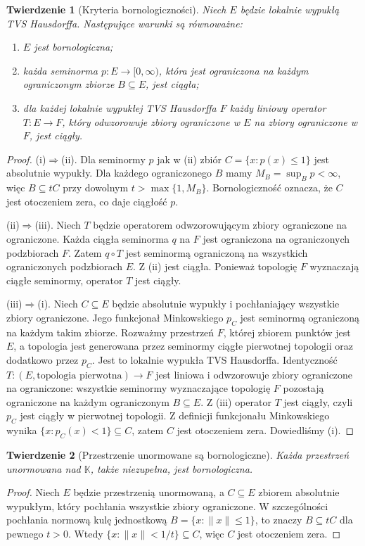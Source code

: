 \documentclass[11pt,a4paper]{article}
\numberwithin{equation}{section}
\theoremstyle{plain}
\newtheorem{twierdzenie}{Twierdzenie}[section]
\theoremstyle{definition}
\theoremstyle{remark}
\newcommand{\K}{\mathbb K}
\begin{document}
\begin{twierdzenie}[Kryteria bornologiczności]\label{thm:bornological-equiv}
Niech $E$ będzie lokalnie wypukłą TVS Hausdorffa.
Następujące warunki są równoważne:
\begin{enumerate}[label=\textup{(\roman*)}]
\item $E$ jest bornologiczna;
\item każda seminorma $p:E\to[0,\infty)$, która jest
ograniczona na każdym ograniczonym zbiorze $B\subseteq E$,
jest ciągła;
\item dla każdej lokalnie wypukłej TVS Hausdorffa $F$
każdy liniowy operator $T:E\to F$, który odwzorowuje
zbiory ograniczone w $E$ na zbiory ograniczone w $F$,
jest ciągły.
\end{enumerate}
\end{twierdzenie}
\begin{proof}
(i)$\Rightarrow$(ii). Dla seminormy $p$ jak w (ii)
zbiór $C=\{x:p(x)\le1\}$ jest absolutnie wypukły.
Dla każdego ograniczonego $B$ mamy $M_B=\sup_Bp<\infty$,
więc $B\subseteq tC$ przy dowolnym $t>\max\{1,M_B\}$.
Bornologiczność oznacza, że $C$ jest otoczeniem zera,
co daje ciągłość $p$.

(ii)$\Rightarrow$(iii). Niech $T$ będzie operatorem
odwzorowującym zbiory ograniczone na ograniczone.
Każda ciągła seminorma $q$ na $F$ jest ograniczona
na ograniczonych podzbiorach $F$. Zatem $q\circ T$
jest seminormą ograniczoną na wszystkich ograniczonych
podzbiorach $E$. Z (ii) jest ciągła. Ponieważ topologię
$F$ wyznaczają ciągłe seminormy, operator $T$ jest ciągły.

(iii)$\Rightarrow$(i). Niech $C\subseteq E$ będzie
absolutnie wypukły i pochłaniający wszystkie zbiory
ograniczone. Jego funkcjonał Minkowskiego $p_C$
jest seminormą ograniczoną na każdym takim zbiorze.
Rozważmy przestrzeń $F$, której zbiorem punktów jest $E$,
a topologia jest generowana przez seminormy ciągłe
pierwotnej topologii oraz dodatkowo przez $p_C$.
Jest to lokalnie wypukła TVS Hausdorffa. Identyczność
$T:(E,\text{topologia pierwotna})\to F$ jest liniowa
i odwzorowuje zbiory ograniczone na ograniczone:
wszystkie seminormy wyznaczające topologię $F$
pozostają ograniczone na każdym ograniczonym $B\subseteq E$.
Z (iii) operator $T$ jest ciągły, czyli $p_C$ jest
ciągły w pierwotnej topologii. Z definicji funkcjonału
Minkowskiego wynika $\{x:p_C(x)<1\}\subseteq C$,
zatem $C$ jest otoczeniem zera. Dowiedliśmy (i).
\end{proof}

\begin{twierdzenie}[Przestrzenie unormowane są bornologiczne]
\label{thm:normed-bornological}
Każda przestrzeń unormowana nad $\K$, także niezupełna,
jest bornologiczna.
\end{twierdzenie}
\begin{proof}
Niech $E$ będzie przestrzenią unormowaną, a $C\subseteq E$
zbiorem absolutnie wypukłym, który pochłania wszystkie
zbiory ograniczone. W szczególności pochłania normową
kulę jednostkową $B=\{x:\|x\|\le1\}$, to znaczy
$B\subseteq tC$ dla pewnego $t>0$. Wtedy
$\{x:\|x\|<1/t\}\subseteq C$, więc $C$ jest
otoczeniem zera.
\end{proof}
\end{document}
